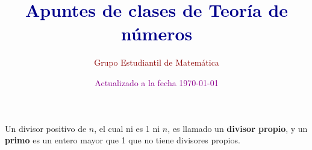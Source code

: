 \documentclass{gemnumber} %
\title{\Huge\bfseries\textcolor{DarkBlue}{Apuntes de clases de Teoría de números}}
\author{\LARGE\textcolor{DarkRed}{Grupo Estudiantil de Matemática}}
\date{\textcolor{DarkMagenta}{Actualizado a la fecha \today}}
\begin{document}
\maketitle



\newpage

\renewcommand{\contentsname}{Tabla de contenido}

\tableofcontents











Un divisor positivo de $n$, el cual ni es 1 ni $n$, es llamado un \textbf{divisor propio}, y un \textbf{primo} es un entero mayor que 1 que no tiene divisores propios.
\end{document}

